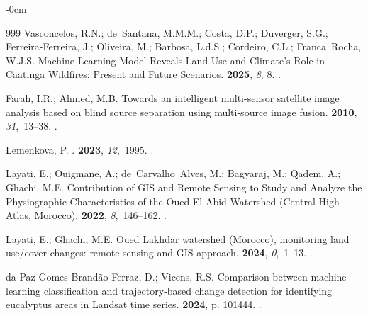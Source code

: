 \documentclass[geomatics,article,accept,pdftex,oneauthor]{Definitions/mdpi}
\begin{document}
\begin{adjustwidth}{-\extralength}{0cm}
\begin{thebibliography}{999}
Vasconcelos, R.N.; de~Santana, M.M.M.; Costa, D.P.; Duverger, S.G.;
  Ferreira-Ferreira, J.; Oliveira, M.; Barbosa, L.d.S.; Cordeiro, C.L.;
  Franca~Rocha, W.J.S.
\newblock Machine Learning Model Reveals Land Use and Climate's Role in
  Caatinga Wildfires: Present and Future Scenarios.
 {\bf 2025}, {\em 8}, 8.
.

Farah, I.R.; Ahmed, M.B.
\newblock Towards an intelligent multi-sensor satellite image analysis based on
  blind source separation using multi-source image fusion.
 {\bf 2010}, {\em
  31},~13--38.
.

Lemenkova, P.
.
 {\bf 2023}, {\em 12},~1995.
.

Layati, E.; Ouigmane, A.; de~Carvalho~Alves, M.; Bagyaraj, M.; Qadem, A.;
  Ghachi, M.E.
\newblock Contribution of GIS and Remote Sensing to Study and Analyze the
  Physiographic Characteristics of the Oued El-Abid Watershed (Central High
  Atlas, Morocco).
 {\bf 2022}, {\em 8},~146--162.
.

Layati, E.; Ghachi, M.E.
\newblock Oued Lakhdar watershed (Morocco), monitoring land use/cover changes:
  remote sensing and GIS approach.
 {\bf 2024}, {\em 0},~1--13.
.

{da Paz Gomes Brand{\~a}o Ferraz}, D.; Vicens, R.S.
\newblock Comparison between machine learning classification and
  trajectory-based change detection for identifying eucalyptus areas in Landsat
  time series.
 {\bf
  2024}, p. 101444.
.


\end{thebibliography}
\end{adjustwidth}
\end{document}
